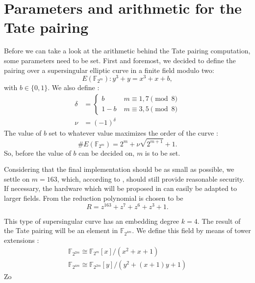 \section{Parameters and arithmetic for the Tate pairing\label{section-pairings}}

Before we can take a look at the arithmetic behind the Tate pairing computation, some parameters need to be set. First and foremost, we decided to define the pairing over a supersingular elliptic curve in a finite field modulo two:
\begin{displaymath}
E(\mathbb{F}_{2^m}) : y^3 + y = x^3 + x + b,
\end{displaymath}
with $b \in \{0,1\}$. We also define \cite{beuchat}:
\begin{displaymath}\begin{aligned}
\delta	&= \begin{cases}
				b		\qquad &m \equiv 1, 7 \pmod 8\\
				1 - b			&m \equiv 3, 5	\pmod 8
				\end{cases}\\
\nu		&= (-1)^{\delta}
\end{aligned}\end{displaymath}
The value of $b$ set to whatever value maximizes the order of the curve \cite{beuchat, barreto-efficient}:
\begin{displaymath}
\#E(\mathbb{F}_{2^m}) = 2^m + \nu \sqrt{2^{m+1}} + 1.
\end{displaymath}
So, before the value of $b$ can be decided on, $m$ is to be set.

Considering that the final implementation should be as small as possible, we settle on $m = 163$, which, according to \cite{lenstra}, should still provide reasonable security. If necessary, the hardware which will be proposed in  can easily be adapted to larger fields. From \cite{sec2} the reduction polynomial is chosen to be 
\begin{displaymath}
R = z^{163} + z^7 + z^6 + z^3 + 1.
\end{displaymath}

This type of supersingular curve has an embedding degree $k = 4$. The result of the Tate pairing will be an element in $\mathbb{F}_{2^{4 m}}$. We define this field by means of tower extensions \cite{bertoni}:
\begin{displaymath}\begin{gathered}
\mathbb{F}_{2^{2 m}} \cong \mathbb{F}_{2^{m}}[x]/\left(x^2 + x + 1\right)\\
\mathbb{F}_{2^{4 m}} \cong \mathbb{F}_{2^{2 m}}[y]/\left(y^2 + (x + 1)y + 1\right)
\end{gathered}\end{displaymath}
Zo
